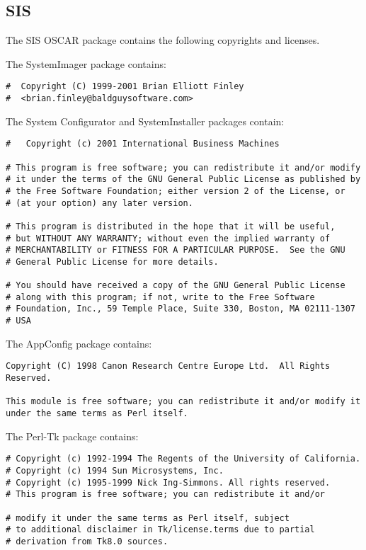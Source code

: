 %
%
%

\subsection{SIS}
The SIS OSCAR package contains the following copyrights and licenses.

The SystemImager package contains:

\begin{verbatim}
#  Copyright (C) 1999-2001 Brian Elliott Finley 
#  <brian.finley@baldguysoftware.com>
\end{verbatim}

The System Configurator and SystemInstaller packages contain:

\begin{verbatim}
#   Copyright (c) 2001 International Business Machines

# This program is free software; you can redistribute it and/or modify
# it under the terms of the GNU General Public License as published by
# the Free Software Foundation; either version 2 of the License, or 
# (at your option) any later version.

# This program is distributed in the hope that it will be useful,
# but WITHOUT ANY WARRANTY; without even the implied warranty of 
# MERCHANTABILITY or FITNESS FOR A PARTICULAR PURPOSE.  See the GNU
# General Public License for more details.

# You should have received a copy of the GNU General Public License
# along with this program; if not, write to the Free Software 
# Foundation, Inc., 59 Temple Place, Suite 330, Boston, MA 02111-1307
# USA
\end{verbatim}

The AppConfig package contains:

\begin{verbatim}
Copyright (C) 1998 Canon Research Centre Europe Ltd.  All Rights
Reserved. 

This module is free software; you can redistribute it and/or modify it 
under the same terms as Perl itself.
\end{verbatim}

The Perl-Tk package contains:

\begin{verbatim}
# Copyright (c) 1992-1994 The Regents of the University of California.
# Copyright (c) 1994 Sun Microsystems, Inc.
# Copyright (c) 1995-1999 Nick Ing-Simmons. All rights reserved.
# This program is free software; you can redistribute it and/or

# modify it under the same terms as Perl itself, subject
# to additional disclaimer in Tk/license.terms due to partial
# derivation from Tk8.0 sources.
\end{verbatim}

